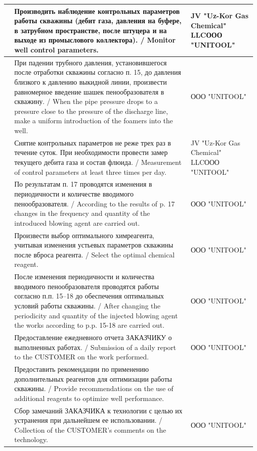 \documentclass[11pt]{article}
\begin{document}
\begin{longtable}{|p{}|p{}|p{}|}
\hline
\centering 15 & Производить наблюдение контрольных параметров работы скважины (дебит газа, давления на буфере, в затрубном пространстве, после штуцера и на выходе из промыслового коллектора). / Monitor well control parameters. & JV "Uz-Kor Gas Chemical" LLC\newline ООО "UNITOOL" \\
\hline
\centering 16 & При падении трубного давления, установившегося после отработки скважины согласно п. 15, до давления близкого к давлению выкидной линии, произвести равномерное введение шашек пенообразователя в скважину. / When the pipe pressure drops to a pressure close to the pressure of the discharge line, make a uniform introduction of the foamers into the well. & ООО "UNITOOL" \\
\hline
\centering 17 & Снятие контрольных параметров не реже трех раз в течение суток. При необходимости провести замер текущего дебита газа и состав флюида. / Measurement of control parameters at least three times per day. & JV "Uz-Kor Gas Chemical" LLC\newline ООО "UNITOOL" \\
\hline
\centering 18 & По результатам п. 17 проводятся изменения в периодичности и количестве вводимого пенообразователя. / According to the results of p. 17 changes in the frequency and quantity of the introduced blowing agent are carried out. & ООО "UNITOOL" \\
\hline
\centering 19 & Произвести выбор оптимального химреагента, учитывая изменения устьевых параметров скважины после вброса реагента. / Select the optimal chemical reagent. & ООО "UNITOOL" \\
\hline
\centering 20 & После изменения периодичности и количества вводимого пенообразователя проводятся работы согласно п.п. 15–18 до обеспечения оптимальных условий работы скважины. / After changing the periodicity and quantity of the injected blowing agent the works according to p.p. 15-18 are carried out. & ООО "UNITOOL" \\
\hline
\centering 21 & Предоставление ежедневного отчета ЗАКАЗЧИКУ о выполненных работах. / Submission of a daily report to the CUSTOMER on the work performed. & ООО "UNITOOL" \\
\hline
\centering 23 & Предоставить рекомендации по применению дополнительных реагентов для оптимизации работы скважины. / Provide recommendations on the use of additional reagents to optimize well performance. & \\
\hline
\centering 24 & Сбор замечаний ЗАКАЗЧИКА к технологии с целью их устранения при дальнейшем ее использовании. / Collection of the CUSTOMER's comments on the technology. & ООО "UNITOOL" \\

\end{longtable}
\end{document}
